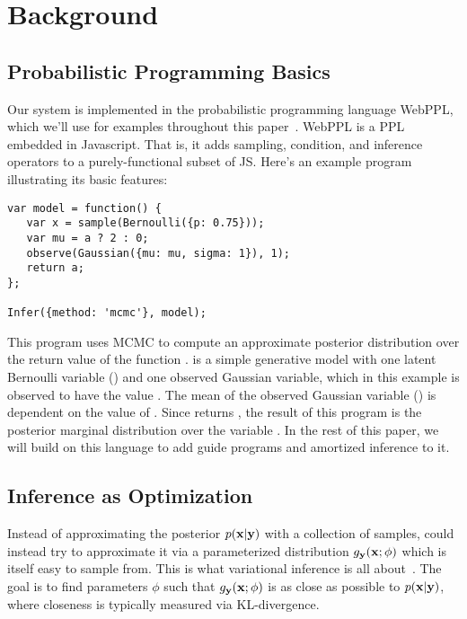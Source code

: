 \section{Background}
\label{sec:background}

\subsection{Probabilistic Programming Basics}

Our system is implemented in the probabilistic programming language WebPPL, which we'll use for examples throughout this paper~\cite{WebPPL}.
WebPPL is a PPL embedded in Javascript.
That is, it adds sampling, condition, and inference operators to a purely-functional subset of JS.
Here's an example program illustrating its basic features:
\begin{lstlisting}
var model = function() {
   var x = sample(Bernoulli({p: 0.75}));
   var mu = a ? 2 : 0;
   observe(Gaussian({mu: mu, sigma: 1}), 1);
   return a;
};

Infer({method: 'mcmc'}, model);
\end{lstlisting}
This program uses MCMC to compute an approximate posterior distribution over the return value of the function .  is a simple generative model with one latent Bernoulli variable () and one observed Gaussian variable, which in this example is observed to have the value . The mean of the observed Gaussian variable () is dependent on the value of . Since  returns , the result of this program is the posterior marginal distribution over the variable .
In the rest of this paper, we will build on this language to add guide programs and amortized inference to it.

\subsection{Inference as Optimization}

Instead of approximating the posterior $p(\mathbf{x} | \mathbf{y})$ with a collection of samples, could instead try to approximate it via a parameterized distribution $g_{\mathbf{y}}(\mathbf{x} ; \phi)$ which is itself easy to sample from.
This is what variational inference is all about~\cite{VariationalInference}.
The goal is to find parameters $\phi$ such that $g_{\mathbf{y}}(\mathbf{x} ; \phi)$ is as close as possible to $p(\mathbf{x} | \mathbf{y})$, where closeness is typically measured via KL-divergence.

